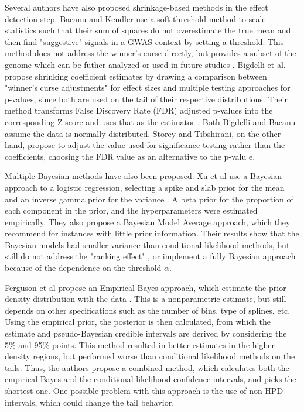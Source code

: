 \documentclass[AMA,STIX1COL]{WileyNJD-v2}\usepackage[]{graphicx}\usepackage[]{color}
\begin{document}
Several authors have also proposed shrinkage-based methods in the effect detection step. Bacanu and Kendler use a soft threshold method to scale statistics such that their sum of squares do not overestimate the true mean and then find "suggestive" signals in a GWAS context by setting a threshold. This method does not address the winner's curse directly, but provides a subset of the genome which can be futher analyzed or used in future studies \cite{bacanu2013extracting}. Bigdelli et al. propose shrinking coefficient estimates by drawing a comparison between "winner's curse adjustments" for effect sizes and multiple testing approaches for p-values, since both are used on the tail of their respective distributions. Their method transforms False Discovery Rate (FDR) adjusted p-values into the corresponding Z-score and uses that as the estimator \cite{bigdeli2016simple}. Both Bigdelli and Bacanu assume the data is normally distributed. Storey and Tibshirani, on the other hand, propose to adjust the value used for significance testing rather than the coefficients, choosing the FDR value as an alternative to the p-valu e\cite{storey2003statistical}.

Multiple Bayesian methods have also been proposed: Xu et al use a Bayesian approach to a logistic regression, selecting a spike and slab prior for the mean and an inverse gamma prior for the variance \cite{xu2011bayesian}. A beta prior for the proportion of each component in the prior, and the hyperparameters were estimated empirically. They also propose a Bayesian Model Average approach, which they recommend for instances with little prior information. Their results show that the Bayesian models had smaller variance than conditional likelihood methods, but still do not address the "ranking effect" \cite{sun2011br}, or implement a fully Bayesian approach because of the dependence on the threshold $\alpha$.

Ferguson et al propose an Empirical Bayes approach, which estimate the prior density distribution with the data \cite{ferguson2013empirical}. This is a nonparametric estimate, but still depends on other specifications such as the number of bins, type of splines, etc. Using the empirical prior, the posterior is then calculated, from which the estimate and pseudo-Bayesian credible intervals are derived by considering the 5\% and 95\% points. This method resulted in better estimates in the higher density regions, but performed worse than conditional likelihood methods on the tails. Thus, the authors propose a combined method, which calculates both the empirical Bayes and the conditional likelihood confidence intervals, and picks the shortest one. One possible problem with this approach is the use of non-HPD intervals, which could change the tail behavior.
\end{document}
